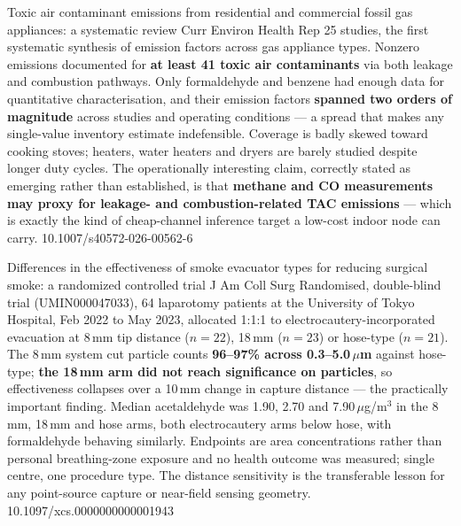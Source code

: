 \documentclass[10pt]{article}
\begin{document}
{Toxic air contaminant emissions from residential and commercial fossil gas appliances: a systematic review}
{Curr Environ Health Rep}
{25 studies, the first systematic synthesis of emission factors across gas appliance types.
Nonzero emissions documented for \textbf{at least 41 toxic air contaminants} via both
leakage and combustion pathways. Only formaldehyde and benzene had enough data for
quantitative characterisation, and their emission factors \textbf{spanned two orders of
magnitude} across studies and operating conditions --- a spread that makes any
single-value inventory estimate indefensible. Coverage is badly skewed toward cooking
stoves; heaters, water heaters and dryers are barely studied despite longer duty cycles.
The operationally interesting claim, correctly stated as emerging rather than established,
is that \textbf{methane and CO measurements may proxy for leakage- and combustion-related
TAC emissions} --- which is exactly the kind of cheap-channel inference target a low-cost
indoor node can carry.}
{10.1007/s40572-026-00562-6}

{Differences in the effectiveness of smoke evacuator types for reducing surgical smoke: a randomized controlled trial}
{J Am Coll Surg}
{Randomised, double-blind trial (UMIN000047033), 64 laparotomy patients at the University
of Tokyo Hospital, Feb 2022 to May 2023, allocated 1:1:1 to electrocautery-incorporated
evacuation at 8\,mm tip distance ($n=22$), 18\,mm ($n=23$) or hose-type ($n=21$). The 8\,mm
system cut particle counts \textbf{96--97\% across 0.3--5.0\,$\mu$m} against hose-type;
\textbf{the 18\,mm arm did not reach significance on particles}, so effectiveness collapses
over a 10\,mm change in capture distance --- the practically important finding. Median
acetaldehyde was 1.90, 2.70 and 7.90\,$\mu$g/m$^3$ in the 8\,mm, 18\,mm and hose arms, both
electrocautery arms below hose, with formaldehyde behaving similarly. Endpoints are area
concentrations rather than personal breathing-zone exposure and no health outcome was
measured; single centre, one procedure type. The distance sensitivity is the transferable
lesson for any point-source capture or near-field sensing geometry.}
{10.1097/xcs.0000000000001943}

\end{document}
